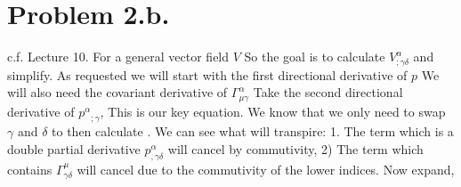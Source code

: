 \documentclass{article}
\begin{document}
\section*{Problem 2.b.}
c.f. Lecture 10. For a general vector field $V$
So the goal is to calculate $V^\alpha_{;\gamma \delta}$ and simplify. As requested we will start with the first directional derivative of $p$
We will also need the covariant derivative of $\Gamma^{\alpha}_{\mu\gamma}$
\g{\Gamma^\alpha_{\mu\gamma;\delta}=\Gamma^\alpha_{\mu\gamma,\delta}+\Gamma^\alpha_{\nu\delta}\Gamma^\nu_{\mu\delta}-\Gamma^\nu_{\mu\delta}\Gamma^\alpha_{\nu\delta}-\Gamma^\nu_{\delta\gamma}\Gamma^\alpha_{\mu\nu}}
Take the second directional derivative of ${p^\alpha}_{;\gamma}$,
This is our key equation. We know that we only need to swap $\gamma$ and $\delta$ to then calculate . We can see what will transpire: 1. The term which is a double partial derivative $p^\alpha_{,\gamma\delta}$ will cancel by commutivity, 2) The term which contains $\Gamma^\mu_{\gamma\delta}$ will cancel due to the commutivity of the lower indices. Now expand,
\end{document}
